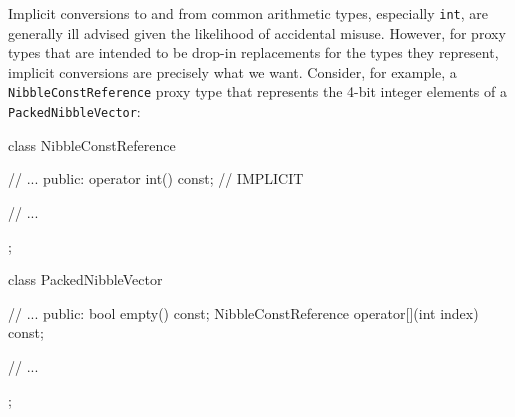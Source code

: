 Implicit conversions to and from common arithmetic types, especially
\lstinline!int!, are generally ill advised given the likelihood of
accidental misuse. 
%
However, for proxy types that are intended to be drop-in replacements for the types they represent, implicit conversions are precisely what we want. Consider, for example, a \lstinline!NibbleConstReference!
 proxy type that represents the 4-bit integer elements of a \lstinline!PackedNibbleVector!:

\begin{emcppslisting}

class NibbleConstReference
{
    // ...
public:
    operator int() const; // IMPLICIT

    // ...
};

class PackedNibbleVector 
{
    // ...
public:
    bool empty() const;
    NibbleConstReference operator[](int index) const;
    
    // ...
};
\end{emcppslisting}

